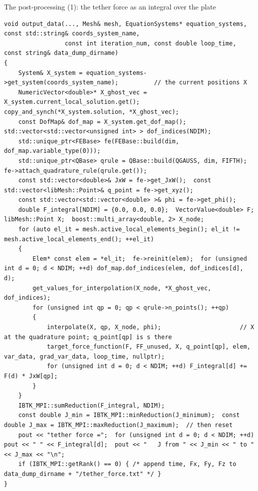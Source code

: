 \documentclass[aspectratio=169,11pt]{beamer}
\begin{document}
\begin{frame}[fragile]{The post-processing (1): the tether force as an integral over the plate}
\label{fr:output}
\begin{lstlisting}[style=cpptiny,basicstyle=\ttfamily\fontsize{5.6}{6.6}\selectfont\color{BlackGray}]
void output_data(..., Mesh& mesh, EquationSystems* equation_systems, const std::string& coords_system_name,
                 const int iteration_num, const double loop_time, const string& data_dump_dirname)
{
    System& X_system = equation_systems->get_system(coords_system_name);          // the current positions X
    NumericVector<double>* X_ghost_vec = X_system.current_local_solution.get();  copy_and_synch(*X_system.solution, *X_ghost_vec);
    const DofMap& dof_map = X_system.get_dof_map();  std::vector<std::vector<unsigned int> > dof_indices(NDIM);
    std::unique_ptr<FEBase> fe(FEBase::build(dim, dof_map.variable_type(0)));
    std::unique_ptr<QBase> qrule = QBase::build(QGAUSS, dim, FIFTH);  fe->attach_quadrature_rule(qrule.get());
    const std::vector<double>& JxW = fe->get_JxW();  const std::vector<libMesh::Point>& q_point = fe->get_xyz();
    const std::vector<std::vector<double> >& phi = fe->get_phi();
    double F_integral[NDIM] = {0.0, 0.0, 0.0};  VectorValue<double> F;  libMesh::Point X;  boost::multi_array<double, 2> X_node;
    for (auto el_it = mesh.active_local_elements_begin(); el_it != mesh.active_local_elements_end(); ++el_it)
    {
        Elem* const elem = *el_it;  fe->reinit(elem);  for (unsigned int d = 0; d < NDIM; ++d) dof_map.dof_indices(elem, dof_indices[d], d);
        get_values_for_interpolation(X_node, *X_ghost_vec, dof_indices);
        for (unsigned int qp = 0; qp < qrule->n_points(); ++qp)
        {
            interpolate(X, qp, X_node, phi);                      // X at the quadrature point; q_point[qp] is s there
            target_force_function(F, FF_unused, X, q_point[qp], elem, var_data, grad_var_data, loop_time, nullptr);
            for (unsigned int d = 0; d < NDIM; ++d) F_integral[d] += F(d) * JxW[qp];
        }
    }
    IBTK_MPI::sumReduction(F_integral, NDIM);
    const double J_min = IBTK_MPI::minReduction(J_minimum);  const double J_max = IBTK_MPI::maxReduction(J_maximum);  // then reset
    pout << "tether force =";  for (unsigned int d = 0; d < NDIM; ++d) pout << " " << F_integral[d];  pout << "   J from " << J_min << " to " << J_max << "\n";
    if (IBTK_MPI::getRank() == 0) { /* append time, Fx, Fy, Fz to data_dump_dirname + "/tether_force.txt" */ }
}
\end{lstlisting}
\end{frame}
\end{document}
